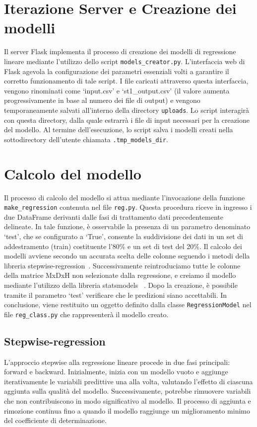 \documentclass{rapportECL}
\begin{document}
\section{Iterazione Server e Creazione dei modelli}

Il server Flask implementa il processo di creazione dei modelli di regressione lineare mediante l'utilizzo dello script \texttt{models\_creator.py}. 
L'interfaccia web di Flask agevola la configurazione dei parametri essenziali volti a garantire il corretto funzionamento di tale script. 
I file caricati attraverso questa interfaccia, vengono rinominati come `input.csv' e `st1\_output.csv' (il valore aumenta progressivamente in base al numero dei file di output)
e vengono temporaneamente salvati all'interno della directory \texttt{uploads}.
Lo script interagirà con questa directory, dalla quale estrarrà i file di input necessari per la creazione del modello.
Al termine dell'esecuzione, lo script salva i modelli creati nella sottodirectory dell'utente chiamata \texttt{.tmp\_models\_dir}.

\section{Calcolo del modello}
Il processo di calcolo del modello si attua mediante l'invocazione della funzione \texttt{make\_regression} contenuta nel file \texttt{reg.py}. 
Questa procedura riceve in ingresso i due DataFrame derivanti dalle fasi di trattamento dati precedentemente delineate. 
In tale funzione, è osservabile la presenza di un parametro denominato `test', che se configurato a `True', 
consente la suddivisione dei dati in un set di addestramento (train) costituente l'80\% e un set di test del 20\%.  Il calcolo dei modelli
avviene secondo un accurata scelta delle colonne seguendo i metodi della libreria stepwise-regression~\cite{stepwise-regression}. 
Successivamente reintroduciamo tutte le colonne della matrice MxDxH non selezionate dalla regressione, e creiamo il modello mediante l'utilizzo della libreria statsmodels
~\cite{statsmodels}. 
Dopo la creazione, è possibile tramite il parametro `test' verificare che le predizioni siano accettabili. In conclusione, viene restituito un oggetto definito 
dalla classe \texttt{RegressionModel} nel file \texttt{reg\_class.py} che rappresenterà il modello creato.

\subsection{Stepwise-regression}
L'approccio stepwise alla regressione lineare procede in due fasi principali: forward e backward. Inizialmente, inizia con un modello vuoto e 
aggiunge iterativamente le variabili predittive una alla volta, valutando l'effetto di ciascuna aggiunta sulla qualità del modello. 
Successivamente, potrebbe rimuovere variabili che non contribuiscono in modo significativo al modello.
Il processo di aggiunta e rimozione continua fino a quando il modello raggiunge un miglioramento minimo del coefficiente di determinazione.
\end{document}
